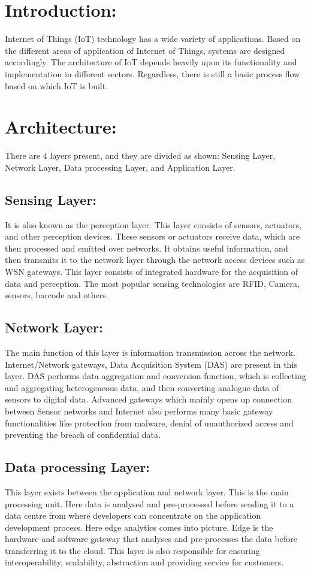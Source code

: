 \section{Introduction:}
Internet of Things (IoT) technology has a wide variety of applications. Based on the different areas of application of Internet of Things, systems are designed accordingly. The architecture of IoT depends heavily upon its functionality and implementation in different sectors. Regardless, there is still a basic process flow based on which IoT is built.

\section{Architecture:}
There are 4 layers present, and they are divided as shown:
Sensing Layer, Network Layer, Data processing Layer, and Application Layer.

\subsection{Sensing Layer:}
It is also known as the perception layer. This layer consists of sensors, actuators, and other perception devices. These sensors or actuators receive data, which are then processed and emitted over networks. It obtains useful information, and then transmits it to the network layer through the network access devices such as WSN gateways. This layer consists of integrated hardware for the acquisition of data and perception. The most popular sensing technologies are RFID, Camera, sensors, barcode and others.

\subsection{Network Layer:}
The main function of this layer is information transmission across the network. Internet/Network gateways, Data Acquisition System (DAS) are present in this layer. DAS performs data aggregation and conversion function, which is collecting and aggregating heterogeneous data, and then converting analogue data of sensors to digital data. Advanced gateways which mainly opens up connection between Sensor networks and Internet also performs many basic gateway functionalities like protection from malware, denial of unauthorized access and preventing the breach of confidential data.

\subsection{Data processing Layer:}
This layer exists between the application and network layer. This is the main processing unit. Here data is analysed and pre-processed before sending it to a data centre from where developers can concentrate on the application development process. Here edge analytics comes into picture. Edge is the hardware and software gateway that analyses and pre-processes the data before transferring it to the cloud. This layer is also responsible for ensuring interoperability, scalability, abstraction and providing service for customers.

